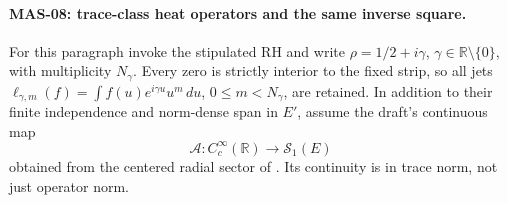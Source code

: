 \documentclass[11pt,a4paper]{article}
\newcommand{\R}{\mathbb R}
\begin{document}
\paragraph{MAS-08: trace-class heat operators and the same inverse square.}
For this paragraph invoke the stipulated RH and write $\rho=1/2+i\gamma$, $\gamma\in\R\setminus\{0\}$, with multiplicity $N_\gamma$. Every zero is strictly interior to the fixed strip, so all jets
$\ell_{\gamma,m}(f)=\int f(u)e^{i\gamma u}u^m\,du$, $0\le m<N_\gamma$, are retained. In addition to their finite independence and norm-dense span in $E'$, assume the draft's continuous map
\[
 \mathcal A:C_c^\infty(\R)\longrightarrow\mathcal S_1(E)
\]
obtained from the centered radial sector of \cite[Theorem 10.3.2.1(2), (10.3.2.2), pp.~453--454]{masullo}. Its continuity is in trace norm, not just operator norm.
\end{document}
